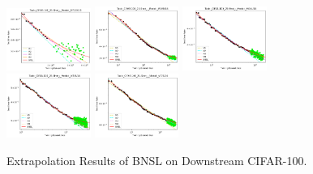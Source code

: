 \documentclass{article} %
\begin{document}
\begin{figure}
\includegraphics[width=0.245\textwidth]{figures/scaling_laws_benchmark_dataset_plots__all_functional_forms/c100_25___BiT_101_3.png}
\includegraphics[width=0.245\textwidth]{figures/scaling_laws_benchmark_dataset_plots__all_functional_forms/c100_25___MiX_B_16.png}
\includegraphics[width=0.245\textwidth]{figures/scaling_laws_benchmark_dataset_plots__all_functional_forms/c100_25___MiX_L_16.png}
\includegraphics[width=0.245\textwidth]{figures/scaling_laws_benchmark_dataset_plots__all_functional_forms/c100_25___ViT_B_16.png}
\includegraphics[width=0.245\textwidth]{figures/scaling_laws_benchmark_dataset_plots__all_functional_forms/c100_25___ViT_S_16.png}

    \caption{
    Extrapolation Results of BNSL on Downstream CIFAR-100. 
    }
    \label{fig:scaling_laws_benchmark_dataset_all_extrapolations__cifar_100}
\end{figure}
\end{document}
